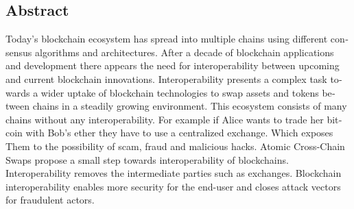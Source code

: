 

\begin{otherlanguage}{american}
	\chapter*{Abstract}
	Today’s blockchain ecosystem has spread into multiple chains using different
	consensus algorithms and architectures. After a decade of blockchain
	applications and development there appears the need for interoperability between
	upcoming and current blockchain innovations. Interoperability presents
	a complex task towards a wider uptake of blockchain technologies to swap
	assets and tokens between chains in a steadily growing environment.
	This ecosystem consists of many chains without any interoperability. For example if Alice wants to trade her bitcoin with Bob's ether
	they have to use a centralized exchange. Which exposes Them to the possibility of scam, fraud and malicious hacks.
	Atomic Cross-Chain Swaps propose a small step towards interoperability of blockchains. Interoperability removes the intermediate parties such as exchanges.
	Blockchain interoperability enables more security for the end-user and closes attack vectors for fraudulent actors.
	
	
\end{otherlanguage}
